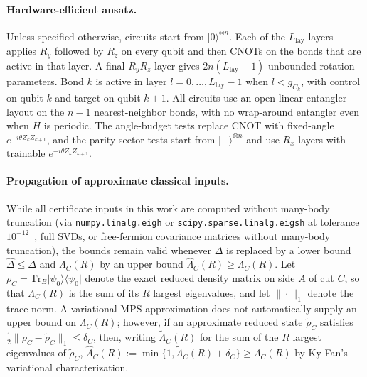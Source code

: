 \documentclass[reprint,aps,pra,floatfix,superscriptaddress,nofootinbib,longbibliography]{revtex4-2}
\theoremstyle{remark}
\theoremstyle{definition}
\newcommand{\ket}[1]{\lvert #1 \rangle}
\newcommand{\bra}[1]{\langle #1 \rvert}
\newcommand{\Tr}{\mathrm{Tr}}
\begin{document}
\paragraph{Hardware-efficient ansatz.}
Unless specified otherwise, circuits start from $\ket{0}^{\otimes n}$. Each of
the $L_{\mathrm{lay}}$ layers applies $R_y$ followed by $R_z$ on every qubit and
then CNOTs on the bonds that are active in that layer. A final $R_yR_z$ layer
gives $2n(L_{\mathrm{lay}}+1)$ unbounded rotation parameters. Bond $k$ is active
in layer $l=0,\dots,L_{\mathrm{lay}}-1$ when $l<g_{C_k}$, with control on qubit
$k$ and target on qubit $k+1$. All circuits use
an open linear entangler layout on the $n-1$ nearest-neighbor bonds, with no
wrap-around entangler even when $H$ is periodic. The angle-budget tests
replace CNOT with fixed-angle $e^{-i\theta Z_kZ_{k+1}}$, and the parity-sector
tests start from $\ket{+}^{\otimes n}$ and use $R_x$ layers with trainable
$e^{-i\theta Z_kZ_{k+1}}$.

\paragraph{Propagation of approximate classical inputs.}
While all certificate inputs in this work are computed without many-body
truncation (via \texttt{numpy.linalg.eigh} or \texttt{scipy.sparse.linalg.eigsh} at tolerance
$10^{-12}$~\cite{virtanen2020scipy}, full SVDs, or free-fermion covariance matrices without many-body truncation), the bounds remain valid whenever $\Delta$ is replaced by a lower bound
$\widehat\Delta\le\Delta$ and $\Lambda_C(R)$ by an upper bound
$\widehat\Lambda_C(R)\ge\Lambda_C(R)$. Let $\rho_C=\Tr_B\ket{\psi_0}\bra{\psi_0}$ denote the exact reduced density
matrix on side $A$ of cut $C$, so that $\Lambda_C(R)$ is the sum of its $R$
largest eigenvalues, and let $\|\cdot\|_1$ denote the trace norm. A variational
MPS approximation does not automatically supply an upper bound on
$\Lambda_C(R)$; however, if an approximate reduced state $\widetilde\rho_C$
satisfies
$\tfrac12\|\rho_C-\widetilde\rho_C\|_1\le\delta_C$, then, writing $\widetilde\Lambda_C(R)$ for the sum of the $R$ largest
eigenvalues of $\widetilde\rho_C$,
$\widehat\Lambda_C(R):=\min\{1,\widetilde\Lambda_C(R)+\delta_C\}\ge\Lambda_C(R)$
by Ky Fan's variational characterization.
\end{document}
